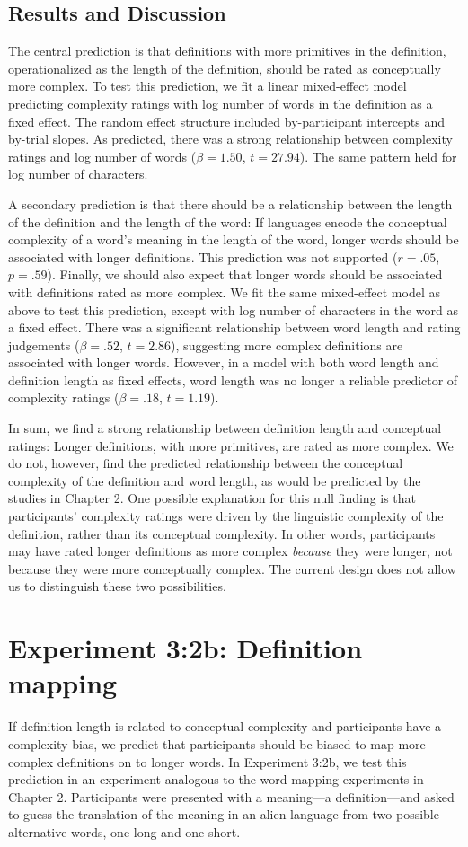 \subsection{Results and Discussion}
The central prediction is that definitions with more primitives in the definition, operationalized as the length of the definition, should be rated as conceptually more complex. To test this prediction, we fit a linear mixed-effect model predicting complexity ratings with log number of words in the definition as a fixed effect. The random effect structure included by-participant intercepts and by-trial slopes. As predicted, there was a strong relationship between complexity ratings and log number of words ($\beta=1.50$, $t =27.94$). The same pattern held for log number of characters.

A secondary prediction is that there should be a relationship between the length of the definition and the length of the word: If languages encode the conceptual complexity of a word's meaning in the length of the word, longer words should be associated with longer definitions. This prediction was not supported ($r=.05$, $p =.59$). Finally, we should also expect that  longer words should be associated with definitions rated as more complex. We fit the same mixed-effect model as above to test this prediction, except with log number of characters in the word as a fixed effect. There was a significant relationship between word length and rating judgements ($\beta=.52$, $t =2.86$), suggesting more complex definitions are associated with longer words. However, in a model with both word length and definition length as fixed effects, word length was no longer a reliable predictor of complexity ratings ($\beta=.18$, $t =1.19$).

In sum, we find a strong relationship between definition length and conceptual ratings: Longer definitions, with more primitives, are rated as more complex. We do not, however, find the predicted relationship between the conceptual complexity of the definition and word length, as would be predicted by the studies in Chapter 2.  One possible explanation for this null finding is that participants' complexity ratings were driven by the linguistic complexity of the definition, rather than its conceptual complexity. In other words, participants may have  rated longer definitions as more complex {\it because} they were longer, not because they were more conceptually complex. The current design does not allow us to distinguish these two possibilities.

\section{Experiment 3:2b: Definition mapping}
If definition length is related to conceptual complexity and participants have a complexity bias, we predict that participants should be biased to map more complex definitions on to longer words. In Experiment 3:2b, we test this prediction in an experiment analogous to the word mapping experiments in Chapter 2. Participants were presented with a meaning---a definition---and asked to guess the translation of the meaning in an alien language from two possible alternative words, one long and one short. 

